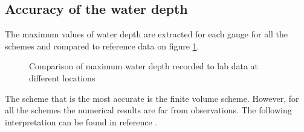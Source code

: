 \subsection{Accuracy of the water depth}

The maximum values of water depth are extracted for each gauge for all the schemes and compared to
reference data on figure \ref{tab:malpasset:max}.

\begin{figure}[H]
\begin{minipage}[t]{0.5\textwidth}
 \centering
\end{minipage}%
\begin{minipage}[t]{0.5\textwidth}
 \centering
\end{minipage}
\begin{minipage}[t]{0.5\textwidth}
 \centering
\end{minipage}%
\begin{minipage}[t]{0.5\textwidth}
 \centering
\end{minipage}
\begin{minipage}[t]{0.5\textwidth}
 \centering
\end{minipage}%
\begin{minipage}[t]{0.5\textwidth}
 \centering
\end{minipage}
  \caption{Comparison of maximum water depth recorded to lab data at different locations}\label{tab:malpasset:max}
\end{figure}

The scheme that is the most accurate is the finite volume scheme.
However, for all the schemes the numerical results are far from observations. The following interpretation can be found in reference \cite{Hervouet2007}. \\

